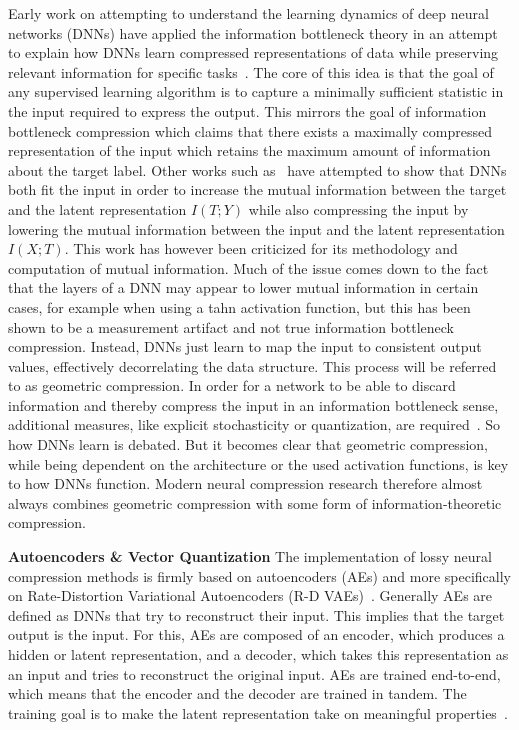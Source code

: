 Early work on attempting to understand the learning dynamics of deep neural networks (DNNs) have applied the information bottleneck theory in an attempt to explain how DNNs learn compressed representations of data while preserving relevant information for specific tasks~\cite[pp.~1-5]{Tishby2015}. The core of this idea is that the goal of any supervised learning algorithm is to capture a minimally sufficient statistic in the input required to express the output. This mirrors the goal of information bottleneck compression which claims that there exists a maximally compressed representation of the input which retains the maximum amount of information about the target label. Other works such as~\cite{Shwartz2017} have attempted to show that DNNs both fit the input in order to increase the mutual information between the target and the latent representation $I(T;Y)$ while also compressing the input by lowering the mutual information between the input and the latent representation $I(X;T)$. This work has however been criticized for its methodology and computation of mutual information. Much of the issue comes down to the fact that the layers of a DNN may appear to lower mutual information in certain cases, for example when using a tahn activation function, but this has been shown to be a measurement artifact and not true information bottleneck compression. Instead, DNNs just learn to map the input to consistent output values, effectively decorrelating the data structure. This process will be referred to as geometric compression. In order for a network to be able to discard information and thereby compress the input in an information bottleneck sense, additional measures, like explicit stochasticity or quantization, are required~\cite{Saxe2018, Goldfeld2020}. So how DNNs learn is debated. But it becomes clear that geometric compression, while being dependent on the architecture or the used activation functions, is key to how DNNs function. Modern neural compression research therefore almost always combines geometric compression with some form of information-theoretic compression.

\textbf{Autoencoders \& Vector Quantization} 
The implementation of lossy neural compression methods is firmly based on autoencoders (AEs) and more specifically on Rate-Distortion Variational Autoencoders (R-D VAEs)~\cite[pp.~145--146]{Yang2022}. Generally AEs are defined as DNNs that try to reconstruct their input. This implies that the target output is the input. For this, AEs are composed of an encoder, which produces a hidden or latent representation, and a decoder, which takes this representation as an input and tries to reconstruct the original input. AEs are trained end-to-end, which means that the encoder and the decoder are trained in tandem. The training goal is to make the latent representation take on meaningful properties~\cite{Chen2023}.

